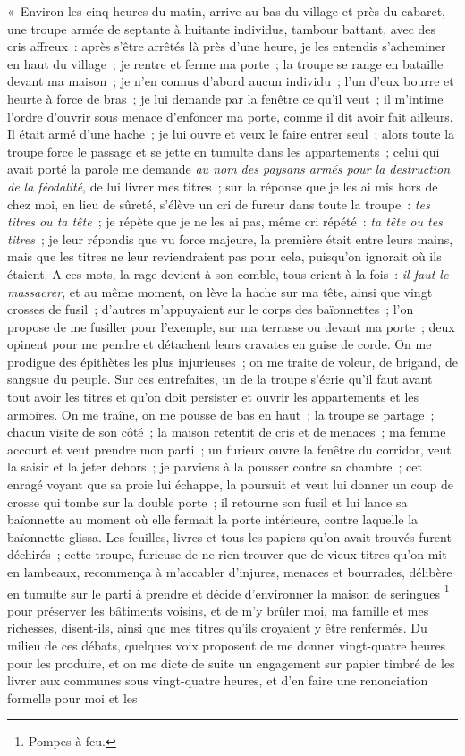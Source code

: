 \documentclass[french,twoside]{book} %
\newenvironment{quoteblock}%
  {\begin{quoting}}
  {\end{quoting}}
\newenvironment{quotebar}{%
    \def\FrameCommand{{\color{rubric!10!}\vrule width 0.5em} \hspace{0.9em}}%
    \def\OuterFrameSep{\itemsep} %
    \MakeFramed {\advance\hsize-\width \FrameRestore}
  }%
  {%
    \endMakeFramed
  }
\renewenvironment{quoteblock}%
  {%
    \savenotes
    \setstretch{0.9}
    \normalfont
    \begin{quotebar}
  }
  {%
    \end{quotebar}
    \spewnotes
  }
\begin{document}
\begin{quoteblock}
 \noindent « Environ les cinq heures du matin, arrive au bas du village et près du cabaret, une troupe armée de septante à huitante individus, tambour battant, avec des cris affreux : après s’être arrêtés là près d’une heure, je les entendis s’acheminer en haut du village ; je rentre et ferme ma porte ; la troupe se range en bataille devant ma maison ; je n’en connus d’abord aucun individu ; l’un d’eux bourre et heurte à force de bras ; je lui demande par la fenêtre ce qu’il veut ; il m’intime l’ordre d’ouvrir sous menace d’enfoncer ma porte, comme il dit avoir fait ailleurs. Il était armé d’une hache ; je lui ouvre et veux le faire entrer seul ; alors toute la troupe force le passage et se jette en tumulte dans les appartements ; celui qui avait porté la parole me demande \emph{au nom des paysans armés pour la destruction de la féodalité}, de lui livrer mes titres ; sur la réponse que je les ai mis hors de chez moi, en lieu de sûreté, s’élève un cri de fureur dans toute la troupe : \emph{tes titres ou ta tête} ; je répète que je ne les ai pas, même cri répété : \emph{ta tête ou tes titres} ; je leur répondis que vu force majeure, la première était entre leurs mains, mais que les titres ne leur reviendraient pas pour cela, puisqu’on ignorait où ils étaient. A ces mots, la rage devient à son comble, tous crient à la fois : \emph{il faut le massacrer}, et au même moment, on lève la hache sur ma tête, ainsi que vingt crosses de fusil ; d’autres m’appuyaient sur le corps des baïonnettes ; l’on propose de me fusiller pour l’exemple, sur ma terrasse ou devant ma porte ; deux opinent pour me pendre et détachent leurs cravates en guise de corde. On me prodigue des épithètes les plus injurieuses ; on me traite de voleur, de brigand, de sangsue du peuple. Sur ces entrefaites, un de la troupe s’écrie qu’il faut avant tout avoir les titres et qu’on doit persister et ouvrir les appartements et les armoires. On me traîne, on me pousse de bas en haut ; la troupe se partage ; chacun visite de son côté ; la maison retentit de cris et de menaces ; ma femme accourt et veut prendre mon parti ; un furieux ouvre la fenêtre du corridor, veut la saisir et la jeter dehors ; je parviens à la pousser contre sa chambre ; cet enragé voyant que sa proie lui échappe, la poursuit et veut lui donner un coup de crosse qui tombe sur la double porte ; il retourne son fusil et lui lance sa baïonnette au moment où elle fermait la porte intérieure, contre laquelle la baïonnette glissa. Les feuilles, livres et tous les papiers qu’on avait trouvés furent déchirés ; cette troupe, furieuse de ne rien trouver que de vieux titres qu’on mit en lambeaux, recommença à m’accabler d’injures, menaces et bourrades, délibère en tumulte sur le parti à prendre et décide d’environner la maison de seringues \footnote{Pompes à feu.} pour préserver les bâtiments voisins, et de m’y brûler moi, ma famille et mes richesses, disent-ils, ainsi que mes titres qu’ils croyaient y être renfermés. Du milieu de ces débats, quelques voix proposent de me donner vingt-quatre heures pour les produire, et on me dicte de suite un engagement sur papier timbré de les livrer aux communes sous vingt-quatre heures, et d’en faire une renonciation formelle pour moi et les 
\end{quoteblock}
\end{document}
